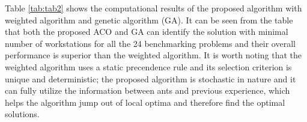 Table \ref{tab:tab2} shows the computational results of the proposed algorithm with weighted algorithm and genetic algorithm (GA).
It can be seen from the table that both the proposed ACO and GA can identify the solution with minimal number of workstations for all the 24 benchmarking problems and their overall performance is superior than the weighted algorithm.
It is worth noting that the weighted algorithm uses a static precendence rule and its selection criterion is unique and deterministic; the proposed algorithm is stochastic in nature and it can fully utilize the information between ants and previous experience, which helps the algorithm jump out of local optima and therefore find the optimal solutions.



\begin{table}[h!]
	\label{tab:tab2}
	\centering
	\caption{Computational Result Comparisons on Benchmarking Problems}
\end{table}
